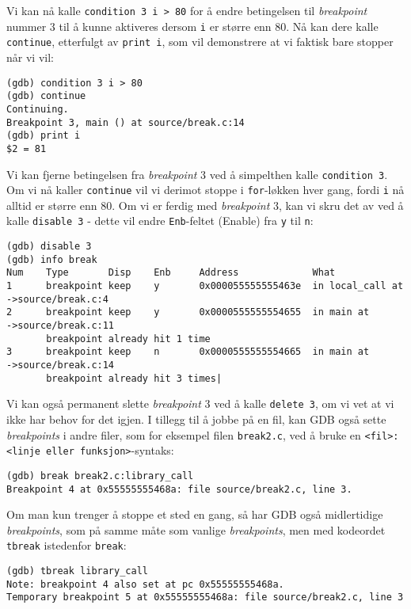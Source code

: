 Vi kan nå kalle \verb|condition 3 i > 80| for å endre betingelsen til \textit{breakpoint} nummer 3 til å kunne aktiveres dersom \verb|i| er større enn 80. Nå kan dere kalle \verb|continue|, etterfulgt av \verb|print i|, som vil demonstrere at vi faktisk bare stopper når vi vil:

\begin{lstlisting}[mathescape=true,keywordstyle=\color{black}]
(gdb) condition 3 i > 80
(gdb) continue
Continuing.
Breakpoint 3, main () at source/break.c:14
(gdb) print i
$2 = 81
\end{lstlisting}

Vi kan fjerne betingelsen fra \textit{breakpoint} 3 ved å simpelthen kalle \verb|condition 3|. Om vi nå kaller \verb|continue| vil vi derimot stoppe i \verb|for|-løkken hver gang, fordi \verb|i| nå alltid er større enn 80. Om vi er ferdig med \textit{breakpoint} 3, kan vi skru det av ved å kalle \verb|disable 3| - dette vil endre \verb|Enb|-feltet (Enable) fra \verb|y| til \verb|n|:

\begin{lstlisting}[mathescape=true,keywordstyle=\color{black}]
(gdb) disable 3
(gdb) info break
Num    Type       Disp    Enb     Address             What
1      breakpoint keep    y       0x000055555555463e  in local_call at
->source/break.c:4
2      breakpoint keep    y       0x0000555555554655  in main at
->source/break.c:11
       breakpoint already hit 1 time
3      breakpoint keep    n       0x0000555555554665  in main at
->source/break.c:14
       breakpoint already hit 3 times|
\end{lstlisting}

Vi kan også permanent slette \textit{breakpoint} 3 ved å kalle \verb|delete 3|, om vi vet at vi ikke har behov for det igjen. I tillegg til å jobbe på en fil, kan GDB også sette \textit{breakpoints} i andre filer, som for eksempel filen \verb|break2.c|, ved å bruke en \verb|<fil>:<linje eller funksjon>|-syntaks:

\begin{lstlisting}[mathescape=true,keywordstyle=\color{black}]  
(gdb) break break2.c:library_call
Breakpoint 4 at 0x55555555468a: file source/break2.c, line 3.
\end{lstlisting}


Om man kun trenger å stoppe et sted en gang, så har GDB også midlertidige \textit{breakpoints}, som på samme måte som vanlige \textit{breakpoints}, men med kodeordet \verb|tbreak| istedenfor \verb|break|:

\begin{lstlisting}[mathescape=true,keywordstyle=\color{black}]
(gdb) tbreak library_call
Note: breakpoint 4 also set at pc 0x55555555468a.
Temporary breakpoint 5 at 0x55555555468a: file source/break2.c, line 3
\end{lstlisting}


